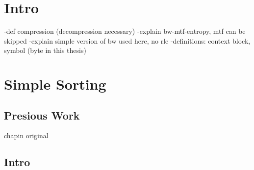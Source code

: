 \documentclass[a4paper]{scrreprt}
\begin{document}
\chapter{Intro}

-def compression (decompression necessary)
-explain bw-mtf-entropy, mtf can be skipped
-explain simple version of bw used here, no rle
-definitions: context block, symbol (byte in this thesis)

\chapter{Simple Sorting}

\section{Presious Work}

chapin original \cite{chapin1998sort,chapin2001diss}

\section{Intro}
\end{document}
